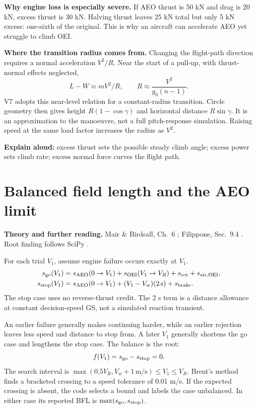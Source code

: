 \documentclass[11pt,letterpaper]{article}
\newcommand{\unit}[1]{\,\mathrm{#1}}
\newcommand{\topic}[1]{\clearpage\section{#1}}
\newcommand{\reading}[1]{{\small\color{navy}\textbf{Theory and further reading.} #1\par}\vspace{3pt}}
\begin{document}
\textbf{Why engine loss is especially severe.}
If AEO thrust is 50 kN and drag is 20 kN, excess thrust is 30 kN.
Halving thrust leaves 25 kN total but only 5 kN excess: one-sixth of the original.
This is why an aircraft can accelerate AEO yet struggle to climb OEI.

\textbf{Where the transition radius comes from.}
Changing the flight-path direction requires a normal acceleration $V^2/R$.
Near the start of a pull-up, with thrust-normal effects neglected,
\[
L-W\approx mV^2/R,\qquad
R\approx\frac{V^2}{g_0(n-1)}.
\]
V7 adopts this near-level relation for a constant-radius transition.
Circle geometry then gives height $R(1-\cos\gamma)$ and horizontal distance
$R\sin\gamma$. It is an approximation to the manoeuvre, not a full pitch-response
simulation. Raising speed at the same load factor increases the radius as $V^2$.
\begin{keyidea}
\textbf{Explain aloud:} excess thrust sets the possible steady climb angle;
excess power sets climb rate; excess normal force curves the flight path.
\end{keyidea}

\topic{Balanced field length and the AEO limit}
\reading{Mair \& Birdsall, Ch.~6 \cite{mair}; Filippone, Sec.~9.4 \cite{filippone}. Root finding follows SciPy \cite{scipy-brent}.}
For each trial $V_1$, assume engine failure occurs exactly at $V_1$.
\begin{align*}
s_{\rm go}(V_1)&=s_{\rm AEO}(0\to V_1)+s_{\rm OEI}(V_1\to V_R)
+s_{\rm rot}+s_{\rm air,OEI},\\
s_{\rm stop}(V_1)&=s_{\rm AEO}(0\to V_1)+(V_1-V_w)(2\unit s)
+s_{\rm brake}.
\end{align*}
The stop case uses no reverse-thrust credit. The 2 s term is a distance allowance
at constant decision-speed GS, not a simulated reaction transient.

An earlier failure generally makes continuing harder, while an earlier rejection
leaves less speed and distance to stop from. A later $V_1$ generally shortens the
go case and lengthens the stop case. The balance is the root:
\[
f(V_1)=s_{\rm go}-s_{\rm stop}=0.
\]
The search interval is $\max(0.5V_R,V_w+1\unit{m/s})\le V_1\le V_R$.
Brent's method finds a bracketed crossing to a speed tolerance of 0.01 m/s.
If the expected crossing is absent, the code selects a bound and labels the case
unbalanced. In either case its reported BFL is $\max(s_{\rm go},s_{\rm stop})$.
\end{document}
